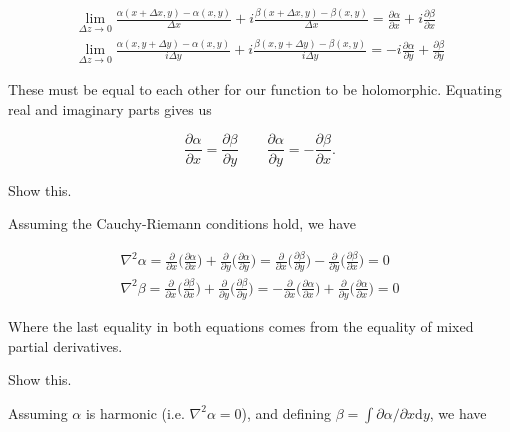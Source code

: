 \documentclass[../the-road-to-reality.tex]{subfiles}
\begin{document}
\begin{questions}
\begin{solution}
        \begin{align*}
                \lim_{\Delta{z}\to{0}}\frac{\alpha(x + \Delta{x}, y) - \alpha(x, y)}{\Delta{x}} + i\frac{\beta(x + \Delta{x}, y) - \beta(x, y)}{\Delta{x}} = \frac{\partial\alpha}{\partial{x}} + i\frac{\partial\beta}{\partial{x}} \\
                \lim_{\Delta{z}\to{0}}\frac{\alpha(x, y + \Delta{y}) - \alpha(x, y)}{i\Delta{y}} + i\frac{\beta(x, y + \Delta{y}) - \beta(x, y)}{i\Delta{y}} = -i\frac{\partial\alpha}{\partial{y}} + \frac{\partial\beta}{\partial{y}}
        \end{align*}

        These must be equal to each other for our function to be holomorphic. Equating real and imaginary parts gives us

	\[
        \frac{\partial\alpha}{\partial{x}} = \frac{\partial\beta}{\partial{y}} \qquad \frac{\partial\alpha}{\partial{y}} = -\frac{\partial\beta}{\partial{x}}
	.\] 
\end{solution}

\question Show this.

\begin{solution}
        Assuming the Cauchy-Riemann conditions hold, we have

        \begin{align*}
                \nabla^2\alpha = \frac{\partial}{\partial{x}}\Big(\frac{\partial\alpha}{\partial{x}}\Big) + \frac{\partial}{\partial{y}}\Big(\frac{\partial\alpha}{\partial{y}}\Big) = \frac{\partial}{\partial{x}}\Big(\frac{\partial\beta}{\partial{y}}\Big) - \frac{\partial}{\partial{y}}\Big(\frac{\partial\beta}{\partial{x}}\Big) = 0 \\
                \nabla^2\beta = \frac{\partial}{\partial{x}}\Big(\frac{\partial\beta}{\partial{x}}\Big) + \frac{\partial}{\partial{y}}\Big(\frac{\partial\beta}{\partial{y}}\Big) = -\frac{\partial}{\partial{x}}\Big(\frac{\partial\alpha}{\partial{x}}\Big) + \frac{\partial}{\partial{y}}\Big(\frac{\partial\alpha}{\partial{x}}\Big) = 0
        \end{align*}

        Where the last equality in both equations comes from the equality of mixed partial derivatives.
\end{solution}

\question Show this.

\begin{solution}
        Assuming $\alpha$ is harmonic (i.e. $\nabla^2\alpha = 0$), and defining $\beta = \int\partial\alpha/\partial{x}\mathrm{d}y$, we have


\end{solution}
\end{questions}
\end{document}
